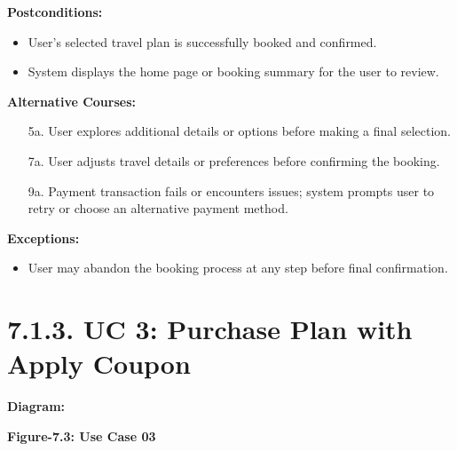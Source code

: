 \documentclass{scrreprt}
\begin{document}
\textbf{Postconditions:}
\begin{itemize}
    \item User's selected travel plan is successfully booked and confirmed.
    \item System displays the home page or booking summary for the user to review.
\end{itemize}

\textbf{Alternative Courses:}
\begin{itemize}
    \item[5a.] User explores additional details or options before making a final selection.
    \item[7a.] User adjusts travel details or preferences before confirming the booking.
    \item[9a.] Payment transaction fails or encounters issues; system prompts user to retry or choose an alternative payment method.
\end{itemize}

\textbf{Exceptions:}
\begin{itemize}
    \item User may abandon the booking process at any step before final confirmation.
\end{itemize}

\section*{\textbf{7.1.3. UC 3: Purchase Plan with Apply Coupon}}
\textbf{Diagram:}
\newline
\newline
{}
\begin{center}
    \parbox{0.8\textwidth}{ 
        \centering
        \textbf{Figure-7.3: Use Case 03}
    }
\end{center}
\end{document}
